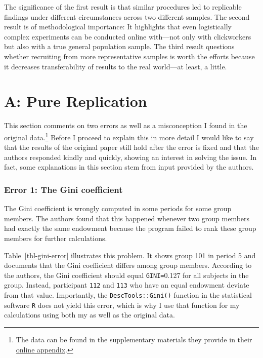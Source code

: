\documentclass[
  authoryear,
  preprint,
  3p]{elsarticle}
\begin{document}
The significance of the first result is that similar procedures led to
replicable findings under different circumstances across two different
samples. The second result is of methodological importance: It
highlights that even logistically complex experiments can be conducted
online with---not only with clickworkers but also with a true general
population sample. The third result questions whether recruiting from
more representative samples is worth the efforts because it decreases
transferability of results to the real world---at least, a little.

\newpage{}

\hypertarget{a-pure-replication}{%
\section{A: Pure Replication}\label{a-pure-replication}}

This section comments on two errors as well as a misconception I found
in the original data.\footnote{The data can be found in the
  supplementary materials they provide in their
  \href{https://www.sciencedirect.com/science/article/pii/S0047272717300361\#s0115}{online
  appendix}.} Before I proceed to explain this in more detail I would
like to say that the results of the original paper still hold after the
error is fixed and that the authors responded kindly and quickly,
showing an interest in solving the issue. In fact, some explanations in
this section stem from input provided by the authors.

\hypertarget{error-1-the-gini-coefficient}{%
\subsubsection{Error 1: The Gini
coefficient}\label{error-1-the-gini-coefficient}}

The Gini coefficient is wrongly computed in some periods for some group
members. The authors found that this happened whenever two group members
had exactly the same endowment because the program failed to rank these
group members for further calculations.

Table~\ref{tbl-gini-error} illustrates this problem. It shows group 101
in period 5 and documents that the Gini coefficient differs among group
members. According to the authors, the Gini coefficient should equal
\texttt{GINI=}0.127 for all subjects in the group. Instead, participant
\texttt{112} and \texttt{113} who have an equal endowment deviate from
that value. Importantly, the \texttt{DescTools::Gini()} function in the
statistical software \texttt{R} does not yield this error, which is why
I use that function for my calculations using both my as well as the
original data.
\end{document}
